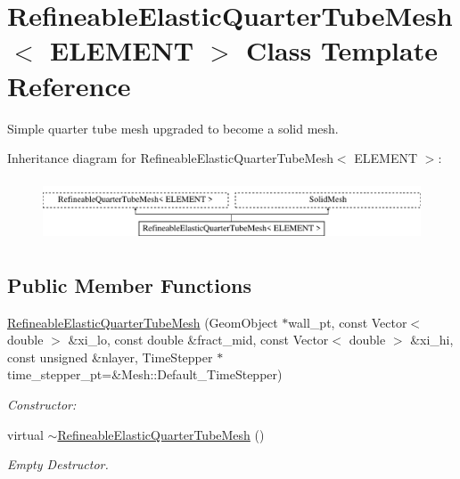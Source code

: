 \hypertarget{classRefineableElasticQuarterTubeMesh}{}\section{Refineable\+Elastic\+Quarter\+Tube\+Mesh$<$ E\+L\+E\+M\+E\+NT $>$ Class Template Reference}
\label{classRefineableElasticQuarterTubeMesh}


Simple quarter tube mesh upgraded to become a solid mesh.  


Inheritance diagram for Refineable\+Elastic\+Quarter\+Tube\+Mesh$<$ E\+L\+E\+M\+E\+NT $>$\+:\begin{figure}[H]
\begin{center}
\leavevmode
\includegraphics[height=1.854305cm]{classRefineableElasticQuarterTubeMesh}
\end{center}
\end{figure}
\subsection*{Public Member Functions}
\begin{DoxyCompactItemize}
\item 
\hyperlink{classRefineableElasticQuarterTubeMesh_a97c25a8845b2d8ab2a4aef1c0407bacd}{Refineable\+Elastic\+Quarter\+Tube\+Mesh} (Geom\+Object $\ast$wall\+\_\+pt, const Vector$<$ double $>$ \&xi\+\_\+lo, const double \&fract\+\_\+mid, const Vector$<$ double $>$ \&xi\+\_\+hi, const unsigned \&nlayer, Time\+Stepper $\ast$time\+\_\+stepper\+\_\+pt=\&Mesh\+::\+Default\+\_\+\+Time\+Stepper)
\begin{DoxyCompactList}\small\item\em Constructor\+: \end{DoxyCompactList}\item 
virtual \hyperlink{classRefineableElasticQuarterTubeMesh_a157397dff3fb4ab8b1daea787bc9f97c}{$\sim$\+Refineable\+Elastic\+Quarter\+Tube\+Mesh} ()
\begin{DoxyCompactList}\small\item\em Empty Destructor. \end{DoxyCompactList}\end{DoxyCompactItemize}


